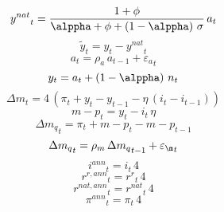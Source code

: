 \begin{dmath}
{{y^{nat}}}_{t}=\frac{1+{{\phi}}}{{{\alppha}}+{{\phi}}+\left(1-{{\alppha}}\right)\, {{\sigma}}}\, {{a}}_{t}
\end{dmath}
\begin{dmath}
{{\tilde y}}_{t}={{y}}_{t}-{{y^{nat}}}_{t}
\end{dmath}
\begin{dmath}
{{a}}_{t}={{\rho_a}}\, {{a}}_{t-1}+{{\varepsilon_a}}_{t}
\end{dmath}
\begin{dmath}
{{y}}_{t}={{a}}_{t}+\left(1-{{\alppha}}\right)\, {{n}}_{t}
\end{dmath}
\begin{dmath}
{{\Delta m}}_{t}=4\, \left({{\pi}}_{t}+{{y}}_{t}-{{y}}_{t-1}-{{\eta}}\, \left({{i}}_{t}-{{i}}_{t-1}\right)\right)
\end{dmath}
\begin{dmath}
{{m-p}}_{t}={{y}}_{t}-{{i}}_{t}\, {{\eta}}
\end{dmath}
\begin{dmath}
{{\Delta m_q}}_{t}={{\pi}}_{t}+{{m-p}}_{t}-{{m-p}}_{t-1}
\end{dmath}
\begin{dmath}
{{\Delta m_q}}_{t}={{\rho_{m}}}\, {{\Delta m_q}}_{t-1}+{{\varepsilon_\m}}_{t}
\end{dmath}
\begin{dmath}
{{i^{ann}}}_{t}={{i}}_{t}\, 4
\end{dmath}
\begin{dmath}
{{r^{r,ann}}}_{t}={{r^r}}_{t}\, 4
\end{dmath}
\begin{dmath}
{{r^{nat,ann}}}_{t}={{r^{nat}}}_{t}\, 4
\end{dmath}
\begin{dmath}
{{\pi^{ann}}}_{t}={{\pi}}_{t}\, 4
\end{dmath}
